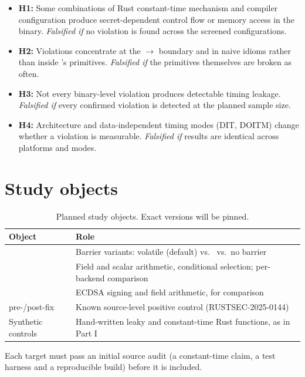 \begin{itemize}
  \item \textbf{H1:} Some combinations of Rust constant-time mechanism and compiler configuration produce secret-dependent control flow or memory access in the binary. \emph{Falsified if} no violation is found across the screened configurations.
  \item \textbf{H2:} Violations concentrate at the $\rightarrow$ boundary and in naive idioms rather than inside 's primitives. \emph{Falsified if} the primitives themselves are broken as often.
  \item \textbf{H3:} Not every binary-level violation produces detectable timing leakage. \emph{Falsified if} every confirmed violation is detected at the planned sample size.
  \item \textbf{H4:} Architecture and data-independent timing modes (DIT, DOITM) change whether a violation is measurable. \emph{Falsified if} results are identical across platforms and modes.
\end{itemize}

\section{Study objects}

\begin{table}[htbp]
\centering
\small
\renewcommand{\arraystretch}{1.18}
\begin{tabular}{@{}P{0.24\textwidth}P{0.66\textwidth}@{}}
\toprule
Object & Role \\
\midrule
{} & Barrier variants: volatile (default) vs.\  vs.\ no barrier \\
 & Field and scalar arithmetic, conditional selection; per-backend comparison \\
 & ECDSA signing and field arithmetic, for comparison \\
 pre-/post-fix & Known source-level positive control (RUSTSEC-2025-0144)~\cite{rustsec2025_0144} \\
Synthetic controls & Hand-written leaky and constant-time Rust functions, as in Part I \\
\bottomrule
\end{tabular}
\caption{Planned study objects. Exact versions will be pinned.}
\label{tab:targets}
\end{table}

Each target must pass an initial source audit (a constant-time claim, a test harness and a reproducible build) before it is included.

